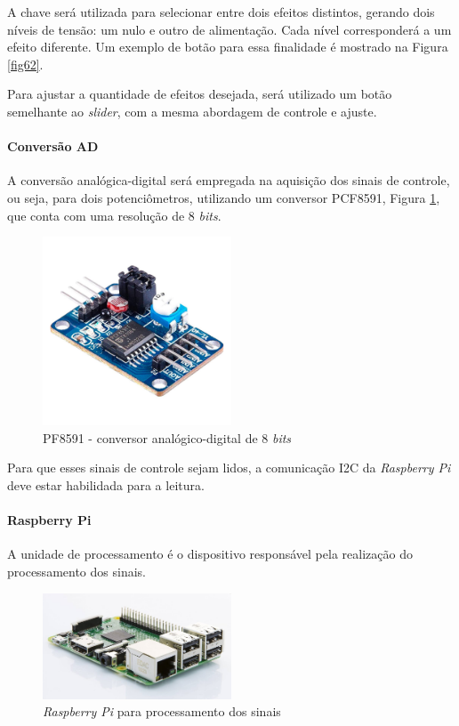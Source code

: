 A chave será utilizada para selecionar entre dois efeitos distintos, gerando dois níveis de tensão: um nulo e outro de alimentação. Cada nível corresponderá a um efeito diferente. Um exemplo de botão para essa finalidade é mostrado na Figura \ref{fig62}.

Para ajustar a quantidade de efeitos desejada, será utilizado um botão semelhante ao \textit{slider}, com a mesma abordagem de controle e ajuste.

\paragraph*{Conversão AD}

A conversão analógica-digital será empregada na aquisição dos sinais de controle, ou seja, para dois potenciômetros, utilizando um conversor PCF8591, Figura \ref{fig64}, que conta com uma resolução de 8 \textit{bits}. 

\begin{figure}[h]
    \centering
    \includegraphics[width=0.5\textwidth]{figuras/fig64.jpg}
    \caption{PF8591 - conversor analógico-digital de 8 \textit{bits} \cite{saravaticomponentes}}
    \label{fig64}
\end{figure}

Para que esses sinais de controle sejam lidos, a comunicação I2C da \textit{Raspberry Pi} deve estar habilidada para a leitura.

\paragraph*{Raspberry Pi}

A unidade de processamento é o dispositivo responsável pela realização do processamento dos sinais. 

\begin{figure}[h]
    \centering
    \includegraphics[width=0.5\textwidth]{figuras/fig65.jpg}
    \caption{\textit{Raspberry Pi} para processamento dos sinais \cite{adrenalineDisplaysLanar}}
    \label{fig65}
\end{figure}

